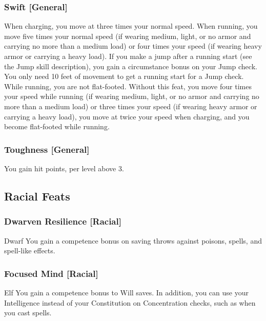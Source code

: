 
\subsubsection{Swift [General]}
 When charging, you move at three times your normal speed. When running, you move five times your normal speed (if wearing medium, light, or no armor and carrying no more than a medium load) or four times your speed (if wearing heavy armor or carrying a heavy load).  If you make a jump after a running start (see the Jump skill description), you gain a  circumstance bonus on your Jump check. You only need 10 feet of movement to get a running start for a Jump check. While running, you are not flat-footed.
 Without this feat, you move four times your speed while running (if wearing medium, light, or no armor and carrying no more than a medium load) or three times your speed (if wearing heavy armor or carrying a heavy load), you move at twice your speed when charging, and you become flat-footed while running.

\subsubsection{Toughness [General]}
 You gain  hit points,  per level above 3.

\subsection{Racial Feats}

\subsubsection{Dwarven Resilience [Racial]}
 Dwarf
 You gain a  competence bonus on saving throws against poisons, spells, and spell-like effects.

\subsubsection{Focused Mind [Racial]}
 Elf
 You gain a  competence bonus to Will saves. In addition, you can use your Intelligence instead of your Constitution on Concentration checks, such as when you cast spells.

